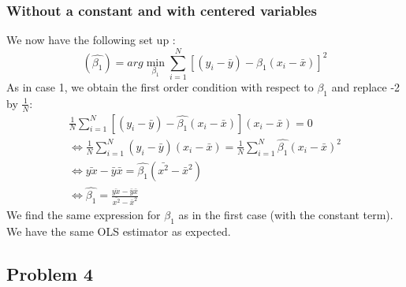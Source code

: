 \documentclass{article}
\begin{document}
\subsubsection{Without a constant and with centered variables}
We now have the following set up : 
\begin{equation}
    (\hat{\beta_1}) = arg\min_{\beta_1}\sum_{i=1}^N [(y_i-\bar{y})-\beta_1(x_i-\bar{x})]^2
\end{equation}
As in case 1, we obtain the first order condition with respect to $\beta_1$ and replace -2 by $\frac{1}{N}$:
\begin{equation}
\begin{aligned}
    \frac{1}{N} \sum_{i=1}^N [(y_i-\bar{y}) -\hat{\beta_1}(x_i-\bar{x})](x_i-\bar{x}) = 0 \\
    \Leftrightarrow \frac{1}{N} \sum_{i=1}^N (y_i-\bar{y})(x_i-\bar{x})=\frac{1}{N}\sum_{i=1}^N \hat{\beta_1}(x_i-\bar{x})^2 \\
    \Leftrightarrow \bar{yx} - \bar{y}\bar{x} = \hat{\beta_1}(\bar{x^2}-\bar{x}^2) \\
    \Leftrightarrow \hat{\beta_1} = \frac{\bar{yx} - \bar{y}\bar{x}}{\bar{x^2}-\bar{x}^2}
\end{aligned}
\end{equation}
We find the same expression for $\hat{\beta_1}$ as in the first case (with the constant term). We have the same OLS estimator as expected. 
\subsection{Problem 4}
\end{document}
